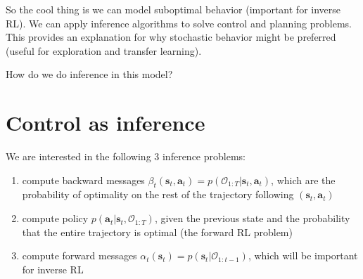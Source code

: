\documentclass{report}
\begin{document}
So the cool thing is we can model suboptimal behavior (important for inverse RL).
We can apply inference algorithms to solve control and planning problems.
This provides an explanation for why stochastic behavior might be preferred (useful for exploration and transfer learning).

How do we do inference in this model?

\section{Control as inference}
We are interested in the following 3 inference problems:
\begin{enumerate}
		\item compute backward messages $ \beta_{ t } (\bm{s}_{t}, \bm{a}_{t} ) = p (\mathcal{O}_{ 1:T }| \bm{s}_{t}, \bm{a}_{t}) $,
				which are the probability of optimality on the rest of the trajectory following $ (\bm{s}_{t}, \bm{a}_{t} )  $
		\item compute policy $ p (\bm{a}_{t} | \bm{s}_{t}, \mathcal{O}_{ 1:T })   $,
				given the previous state and the probability that the entire trajectory is optimal (the forward RL problem)
		\item compute forward messages $ \alpha_{ t } (\bm{s}_{t}) = p (\bm{s}_{t}|\mathcal{O}_{ 1:t-1 })  $, which
				will be important for inverse RL
\end{enumerate}
\end{document}
